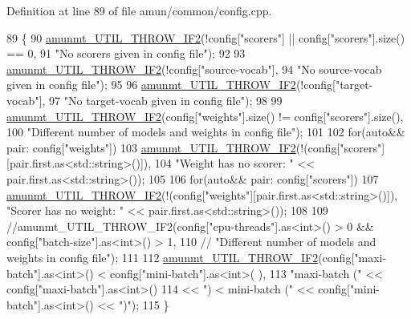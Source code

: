 Definition at line 89 of file amun/common/config.\+cpp.


\begin{DoxyCode}
89                                       \{
90   \hyperlink{exception_8h_a361c5b6ab6490fc4572337346f390fb1}{amunmt\_UTIL\_THROW\_IF2}(!config[\textcolor{stringliteral}{"scorers"}] || config[\textcolor{stringliteral}{"scorers"}].size() == 0,
91                  \textcolor{stringliteral}{"No scorers given in config file"});
92 
93   \hyperlink{exception_8h_a361c5b6ab6490fc4572337346f390fb1}{amunmt\_UTIL\_THROW\_IF2}(!config[\textcolor{stringliteral}{"source-vocab"}],
94                  \textcolor{stringliteral}{"No source-vocab given in config file"});
95 
96   \hyperlink{exception_8h_a361c5b6ab6490fc4572337346f390fb1}{amunmt\_UTIL\_THROW\_IF2}(!config[\textcolor{stringliteral}{"target-vocab"}],
97                  \textcolor{stringliteral}{"No target-vocab given in config file"});
98 
99   \hyperlink{exception_8h_a361c5b6ab6490fc4572337346f390fb1}{amunmt\_UTIL\_THROW\_IF2}(config[\textcolor{stringliteral}{"weights"}].size() != config[\textcolor{stringliteral}{"scorers"}].size(),
100                 \textcolor{stringliteral}{"Different number of models and weights in config file"});
101 
102   \textcolor{keywordflow}{for}(\textcolor{keyword}{auto}&& pair: config[\textcolor{stringliteral}{"weights"}])
103     \hyperlink{exception_8h_a361c5b6ab6490fc4572337346f390fb1}{amunmt\_UTIL\_THROW\_IF2}(!(config[\textcolor{stringliteral}{"scorers"}][pair.first.as<std::string>()]),
104                    \textcolor{stringliteral}{"Weight has no scorer: "} << pair.first.as<std::string>());
105 
106   \textcolor{keywordflow}{for}(\textcolor{keyword}{auto}&& pair: config[\textcolor{stringliteral}{"scorers"}])
107     \hyperlink{exception_8h_a361c5b6ab6490fc4572337346f390fb1}{amunmt\_UTIL\_THROW\_IF2}(!(config[\textcolor{stringliteral}{"weights"}][pair.first.as<std::string>()]), \textcolor{stringliteral}{"Scorer
       has no weight: "} << pair.first.as<std::string>());
108 
109   \textcolor{comment}{//amunmt\_UTIL\_THROW\_IF2(config["cpu-threads"].as<int>() > 0 && config["batch-size"].as<int>() > 1,}
110   \textcolor{comment}{//              "Different number of models and weights in config file");}
111 
112   \hyperlink{exception_8h_a361c5b6ab6490fc4572337346f390fb1}{amunmt\_UTIL\_THROW\_IF2}(config[\textcolor{stringliteral}{"maxi-batch"}].as<int>() < config[\textcolor{stringliteral}{"mini-batch"}].as<int>(
      ),
113                 \textcolor{stringliteral}{"maxi-batch ("} << config[\textcolor{stringliteral}{"maxi-batch"}].as<int>()
114                 << \textcolor{stringliteral}{") < mini-batch ("} << config[\textcolor{stringliteral}{"mini-batch"}].as<int>() << \textcolor{stringliteral}{")"});
115 \}
\end{DoxyCode}


